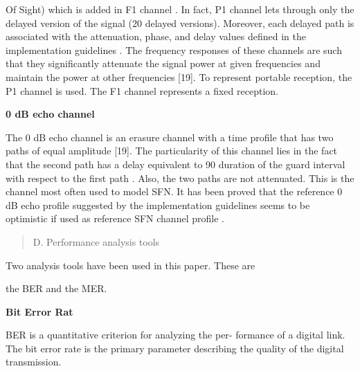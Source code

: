 \documentclass[10pt, conference]{IEEEtran}
\begin{document}
 
\linespread{1.15}
\normalsize{
\noindent Of Sight) which is added in F1 channel \cite{18}. In fact, P1 channel lets through only the delayed version of
the signal (20 delayed versions). Moreover, each delayed
path is associated with the attenuation, phase, and delay
values defined in the implementation guidelines \cite{14}.
The frequency responses of these channels are such that
they significantly attenuate the signal power at given
frequencies and maintain the power at other frequencies
[19]. To represent portable reception, the P1 channel is
used. The F1 channel represents a fixed reception.
\begin{adjustwidth}{-0.5cm}{0cm}
   \textbullet \textbf{ 0 dB echo channel}
\end{adjustwidth}
The 0 dB echo channel is an erasure channel with a
time profile that has two paths of equal amplitude [19].
The particularity of this channel lies in the fact that
the second path has a delay equivalent to 90%
duration of the guard interval with respect to the first
path \cite{19}. Also, the two paths are not attenuated. This is
the channel most often used to model SFN. It has been
proved that the reference 0 dB echo profile suggested by
the implementation guidelines \cite{14} seems to be optimistic
if used as reference SFN channel profile \cite{12}.

\begin{quotation}
    \begin{adjustwidth}{-2cm}{0cm}
        \begin{em}
            D. Performance analysis tools
        \end{em}
    \end{adjustwidth}
\end{quotation}
\begin{adjustwidth}{-0.5cm}{0cm}
   Two analysis tools have been used in this paper. These are
\end{adjustwidth}
\begin{adjustwidth}{-1cm}{0cm}
   the BER and the MER.
\end{adjustwidth}
\begin{adjustwidth}{-0.5cm}{0cm}
   \textbullet \textbf{  Bit Error Rat}
\end{adjustwidth}
BER is a quantitative criterion for analyzing the per-
formance of a digital link. The bit error rate is the
primary parameter describing the quality of the digital
transmission.

\begin{adjustwidth}{1cm}{0cm}


\end{adjustwidth}}
\end{document}
